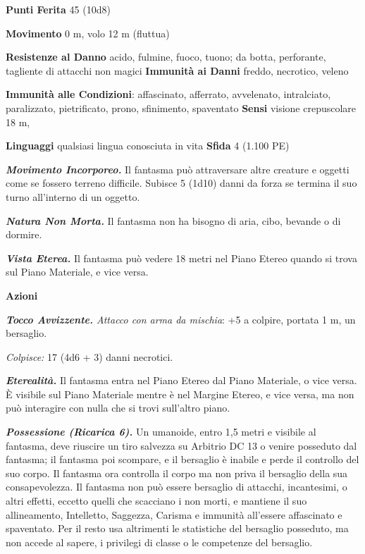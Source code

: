 \begin{multicols}{2}
\textbf{Punti Ferita} 45 (10d8)

\textbf{Movimento} 0 m, volo 12 m (fluttua)

\textbf{Resistenze al Danno} acido, fulmine, fuoco, tuono; da botta,
perforante, tagliente di attacchi non magici \textbf{Immunità ai Danni}
freddo, necrotico, veleno

\textbf{Immunità alle Condizioni}: affascinato, afferrato, avvelenato,
intralciato, paralizzato, pietrificato, prono, sfinimento, spaventato
\textbf{Sensi} visione crepuscolare 18 m, 

\textbf{Linguaggi} qualsiasi lingua conosciuta in vita \textbf{Sfida} 4
(1.100 PE)\smallskip

\emph{\textbf{Movimento Incorporeo.}} Il fantasma può attraversare altre
creature e oggetti come se fossero terreno difficile. Subisce 5 (1d10)
danni da forza se termina il suo turno all'interno di un oggetto.

\emph{\textbf{Natura Non Morta.}} Il fantasma non ha bisogno di aria,
cibo, bevande o di dormire.

\emph{\textbf{Vista Eterea.}} Il fantasma può vedere 18 metri nel Piano
Etereo quando si trova sul Piano Materiale, e vice versa.

\smallskip\textbf{Azioni}

\emph{\textbf{Tocco Avvizzente.} Attacco con arma da mischia}: +5 a
colpire, portata 1 m, un bersaglio.

\emph{Colpisce:} 17 (4d6 + 3) danni necrotici.

\emph{\textbf{Eterealità.}} Il fantasma entra nel Piano Etereo dal Piano
Materiale, o vice versa. È visibile sul Piano Materiale mentre è nel
Margine Etereo, e vice versa, ma non può interagire con nulla che si
trovi sull'altro piano.

\emph{\textbf{Possessione (Ricarica 6).}} Un umanoide, entro 1,5 metri e
visibile al fantasma, deve riuscire un tiro salvezza su Arbitrio DC 13 o
venire posseduto dal fantasma; il fantasma poi scompare, e il bersaglio
è inabile e perde il controllo del suo corpo. Il fantasma ora controlla
il corpo ma non priva il bersaglio della sua consapevolezza. Il fantasma
non può essere bersaglio di attacchi, incantesimi, o altri effetti,
eccetto quelli che scacciano i non morti, e mantiene il suo
allineamento, Intelletto, Saggezza, Carisma e immunità all'essere
affascinato e spaventato. Per il resto usa altrimenti le statistiche del
bersaglio posseduto, ma non accede al sapere, i privilegi di classe o le
competenze del bersaglio.


\end{multicols}
